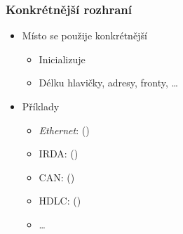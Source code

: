 \begin{frame}
  \frametitle{Konkrétnější rozhraní}

  \begin{itemize}
    \item Místo  se použije konkrétnější 
    \begin{itemize}
      \item Inicializuje 
      \item Délku hlavičky, adresy, fronty, \dots
    \end{itemize}

    \pause

    \item Příklady
    \begin{itemize}
      \item \emph{Ethernet}: 
	()
      \item IRDA:  ()
      \item CAN:  ()
      \item HDLC:  ()
      \item \dots
    \end{itemize}
  \end{itemize}

\end{frame}

